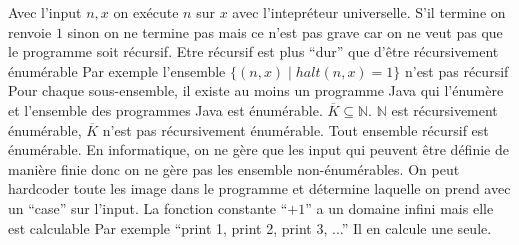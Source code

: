 \begin{mcqs}
  {Avec l'input $n,x$ on exécute $n$ sur $x$ avec l'intepréteur universelle.
  S'il termine on renvoie $1$ sinon on ne termine pas mais ce n'est pas grave car on ne veut pas que le programme soit récursif.}
  {Etre récursif est plus ``dur'' que d'être récursivement énumérable}
  {Par exemple l'ensemble $\{(n,x) \mid \mathit{halt}(n,x)=1\}$ n'est pas récursif}
  {Pour chaque sous-ensemble, il existe au moins un programme Java qui l'énumère et l'ensemble des programmes Java est énumérable.}
  {$\overline{K} \subseteq \mathbb{N}$. $\mathbb{N}$ est récursivement énumérable, $\overline{K}$ n'est pas récursivement énumérable.}
  {Tout ensemble récursif est énumérable. En informatique, on ne gère que les input qui peuvent être définie de manière finie
  donc on ne gère pas les ensemble non-énumérables.}
  {On peut hardcoder toute les image dans le programme et détermine laquelle on prend avec un ``case'' sur l'input.}
  {La fonction constante ``$+1$'' a un domaine infini mais elle est calculable}
  {Par exemple ``print 1, print 2, print 3, ...''}
  {Il en calcule une seule.}
\end{mcqs}
